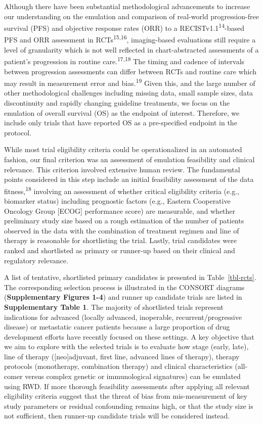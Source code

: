 \documentclass[
  letterpaper,
  DIV=11,
  numbers=noendperiod]{scrartcl}
\begin{document}
Although there have been substantial methodological advancements to
increase our understanding on the emulation and comparison of real-world
progression-free survival (PFS) and objective response rates (ORR) to a
RECISTv1.1\textsuperscript{14}-based PFS and ORR assessment in
RCTs\textsuperscript{15,16}, imaging-based evaluations still require a
level of granularity which is not well reflected in chart-abstracted
assessments of a patient's progression in routine
care.\textsuperscript{17,18} The timing and cadence of intervals between
progression assessments can differ between RCTs and routine care which
may result in measurement error and bias.\textsuperscript{19} Given
this, and the large number of other methodological challenges including
missing data, small sample sizes, data discontinuity and rapidly
changing guideline treatments, we focus on the emulation of overall
survival (OS) as the endpoint of interest. Therefore, we include only
trials that have reported OS as a pre-specified endpoint in the
protocol.

While most trial eligibility criteria could be operationalized in an
automated fashion, our final criterion was an assessment of emulation
feasibility and clinical relevance. This criterion involved extensive
human review. The fundamental points considered in this step include an
initial feasibility assessment of the data fitness,\textsuperscript{18}
involving an assessment of whether critical eligibility criteria (e.g.,
biomarker status) including prognostic factors (e.g., Eastern
Cooperative Oncology Group {[}ECOG{]} performance score) are measurable,
and whether preliminary study size based on a rough estimation of the
number of patients observed in the data with the combination of
treatment regimen and line of therapy is reasonable for shortlisting the
trial. Lastly, trial candidates were ranked and shortlisted as primary
or runner-up based on their clinical and regulatory relevance.

A list of tentative, shortlisted primary candidates is presented in
Table~\ref{tbl-rcts}. The corresponding selection process is illustrated
in the CONSORT diagrams (\textbf{Supplementary Figures 1-4}) and runner
up candidate trials are listed in \textbf{Supplementary Table 1}. The
majority of shortlisted trials represent indications for advanced
(locally advanced, inoperable, recurrent/progressive disease) or
metastatic cancer patients because a large proportion of drug
development efforts have recently focused on these settings. A key
objective that we aim to explore with the selected trials is to evaluate
how stage (early, late), line of therapy ({[}neo{]}adjuvant, first line,
advanced lines of therapy), therapy protocols (monotherapy, combination
therapy) and clinical characteristics (all-comer versus complex genetic
or immunological signatures) can be emulated using RWD. If more thorough
feasibility assessments after applying all relevant eligibility criteria
suggest that the threat of bias from mis-measurement of key study
parameters or residual confounding remains high, or that the study size
is not sufficient, then runner-up candidate trials will be considered
instead.
\end{document}
